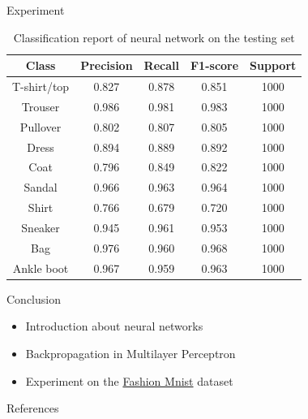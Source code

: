 \documentclass[10pt]{beamer}
\theoremstyle{remark}
\theoremstyle{definition}
\begin{document}
\begin{frame}[allowframebreaks]{Experiment}
	\begin{table} [h!]
		\centering
		\begin{tabular}{ || c | c | c | c | c|| }
		\hline
		Class & Precision & Recall & F1-score & Support \\ [0.5 ex]
		\hline \hline
		T-shirt/top & 0.827 & 0.878 & 0.851 & 1000 \\ \hline
		Trouser & 0.986 & 0.981 & 0.983 & 1000  \\ \hline
		Pullover & 0.802 & 0.807 & 0.805 & 1000 \\ \hline
		Dress & 0.894 & 0.889 & 0.892 & 1000 \\ \hline
		Coat & 0.796 & 0.849 & 0.822 & 1000 \\ \hline
		Sandal & 0.966 &0.963 & 0.964 & 1000\\ \hline
		Shirt & 0.766 & 0.679 & 0.720 & 1000\\ \hline 
		Sneaker & 0.945 & 0.961 & 0.953 & 1000 \\ \hline
		Bag &  0.976 & 0.960 & 0.968 & 1000 \\ \hline
		Ankle boot & 0.967 & 0.959 & 0.963 & 1000 \\ [1ex]
		\hline
		\end{tabular}
		\caption{Classification report of neural network on the testing set}
	\end{table}
\end{frame}

\begin{frame}[allowframebreaks]{Conclusion}
	\begin{itemize}
		\item Introduction about neural networks
  		\item Backpropagation in Multilayer Perceptron
    	\item Experiment on the \href{https://github.com/zalandoresearch/fashion-mnist}{Fashion Mnist} dataset
	\end{itemize}
\end{frame}

\begin{frame}[allowframebreaks]{References}
\printbibliography
\end{frame}
\end{document}
